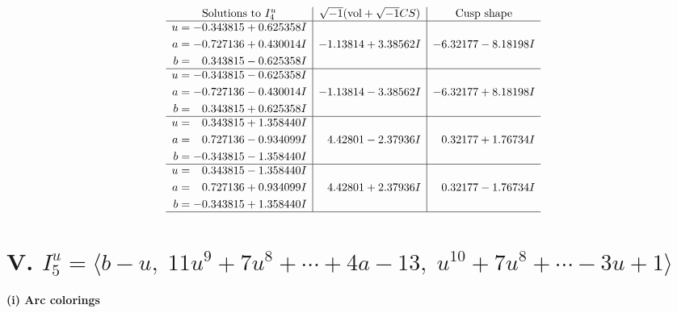 \documentclass[1p]{elsarticle_modified}
\theoremstyle{definition}
\newcommand{\I}{\sqrt{-1}}
\begin{document}
$$\begin{array}{c|c|c}  
\text{Solutions to }I^u_{4}& \I (\text{vol} + \sqrt{-1}CS) & \text{Cusp shape}\\
 \hline 
\begin{aligned}
u &= -0.343815 + 0.625358 I \\
a &= -0.727136 + 0.430014 I \\
b &= \phantom{-}0.343815 - 0.625358 I\end{aligned}
 & -1.13814 + 3.38562 I & -6.32177 - 8.18198 I \\ \hline\begin{aligned}
u &= -0.343815 - 0.625358 I \\
a &= -0.727136 - 0.430014 I \\
b &= \phantom{-}0.343815 + 0.625358 I\end{aligned}
 & -1.13814 - 3.38562 I & -6.32177 + 8.18198 I \\ \hline\begin{aligned}
u &= \phantom{-}0.343815 + 1.358440 I \\
a &= \phantom{-}0.727136 - 0.934099 I \\
b &= -0.343815 - 1.358440 I\end{aligned}
 & \phantom{-}4.42801 - 2.37936 I & \phantom{-}0.32177 + 1.76734 I \\ \hline\begin{aligned}
u &= \phantom{-}0.343815 - 1.358440 I \\
a &= \phantom{-}0.727136 + 0.934099 I \\
b &= -0.343815 + 1.358440 I\end{aligned}
 & \phantom{-}4.42801 + 2.37936 I & \phantom{-}0.32177 - 1.76734 I\\
 \hline 
 \end{array}$$\newpage\newpage\renewcommand{\arraystretch}{1}
\centering \section*{V. $I^u_{5}= \langle b- u,\;11 u^9+7 u^8+\cdots+4 a-13,\;u^{10}+7 u^8+\cdots-3 u+1 \rangle$}
\flushleft \textbf{(i) Arc colorings}\\
\end{document}
